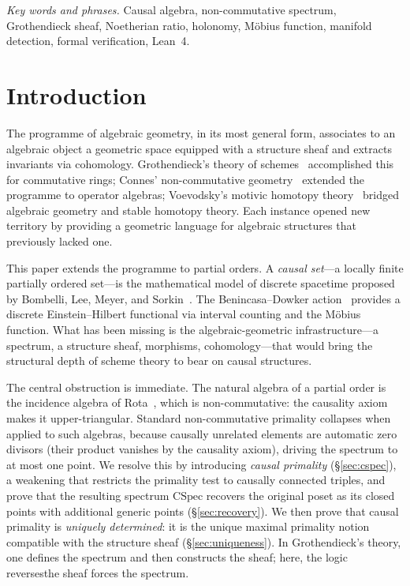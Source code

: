 \documentclass[11pt,a4paper]{article}
\theoremstyle{plain}
\theoremstyle{definition}
\theoremstyle{remark}
\newcommand{\CSpec}{\mathrm{CSpec}}
\begin{document}
\smallskip

\noindent\textit{Key words and phrases.}
Causal algebra, non-commutative spectrum, Grothendieck sheaf, Noetherian ratio, holonomy, M\"obius function, manifold detection, formal verification, Lean~4.

\bigskip


\section{Introduction}

The programme of algebraic geometry, in its most general form, associates to an algebraic object a geometric space equipped with a structure sheaf and extracts invariants via cohomology.
Grothendieck's theory of schemes~\cite{grothendieck1960} accomplished this for commutative rings; Connes' non-commutative geometry~\cite{connes1994} extended the programme to operator algebras; Voevodsky's motivic homotopy theory~\cite{voevodsky2003} bridged algebraic geometry and stable homotopy theory.
Each instance opened new territory by providing a geometric language for algebraic structures that previously lacked one.

This paper extends the programme to partial orders.
A \emph{causal set}---a locally finite partially ordered set---is the mathematical model of discrete spacetime proposed by Bombelli, Lee, Meyer, and Sorkin~\cite{bombelli1987}.
The Benincasa--Dowker action~\cite{benincasa2010} provides a discrete Einstein--Hilbert functional via interval counting and the M\"obius function.
What has been missing is the algebraic-geometric infrastructure---a spectrum, a structure sheaf, morphisms, cohomology---that would bring the structural depth of scheme theory to bear on causal structures.

The central obstruction is immediate.
The natural algebra of a partial order is the incidence algebra of Rota~\cite{rota1964}, which is non-commutative: the causality axiom makes it upper-triangular.
Standard non-commutative primality collapses when applied to such algebras, because causally unrelated elements are automatic zero divisors (their product vanishes by the causality axiom), driving the spectrum to at most one point.
We resolve this by introducing \emph{causal primality} (\S\ref{sec:cspec}), a weakening that restricts the primality test to causally connected triples, and prove that the resulting spectrum $\CSpec$ recovers the original poset as its closed points with additional generic points (\S\ref{sec:recovery}).
We then prove that causal primality is \emph{uniquely determined}: it is the unique maximal primality notion compatible with the structure sheaf (\S\ref{sec:uniqueness}).
In Grothendieck's theory, one defines the spectrum and then constructs the sheaf; here, the logic reverses\textemdash the sheaf forces the spectrum.
\end{document}
